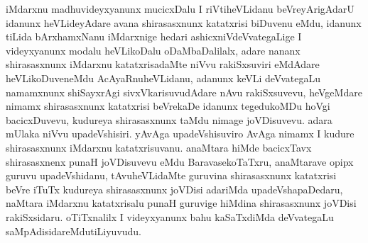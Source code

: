 \centerline{}

\begin{artha}
iMdarxnu madhuvideyxyanunx mucicxDalu I riVtiheVLidanu beVreyArigAdarU idanunx heVLideyAdare avana shirasasxnunx katatxrisi biDuvenu eMdu, idanunx tiLida bArxhamxNanu iMdarxnige hedari ashicxniVdeVvategaLige I videyxyanunx modalu heVLikoDalu oDaMbaDalilalx, adare nananx shirasasxnunx iMdarxnu katatxrisadaMte niVvu rakiSxsuviri eMdAdare heVLikoDuveneMdu AcAyaRnuheVLidanu, adanunx keVLi deVvategaLu namamxnunx shiSayxrAgi sivxVkarisuvudAdare nAvu rakiSxsuvevu, heVgeMdare nimamx shirasasxnunx katatxrisi beVrekaDe idanunx tegedukoMDu hoVgi bacicxDuvevu, kudureya shirasasxnunx taMdu nimage joVDisuvevu. adara mUlaka niVvu upadeVshisiri. yAvAga upadeVshisuviro AvAga nimamx I kudure shirasasxnunx iMdarxnu katatxrisuvanu. anaMtara hiMde bacicxTavx shirasasxnenx punaH joVDisuvevu eMdu BaravasekoTaTxru, anaMtarave opipx guruvu upadeVshidanu, tAvuheVLidaMte guruvina shirasasxnunx katatxrisi beVre iTuTx kudureya shirasasxnunx joVDisi adariMda upadeVshapaDedaru, naMtara iMdarxnu katatxrisalu punaH guruvige  hiMdina shirasasxnunx joVDisi rakiSxsidaru. oTiTxnalilx I videyxyanunx bahu kaSaTxdiMda deVvategaLu saMpAdisidareMdu\break tiLiyuvudu.
\end{artha}

